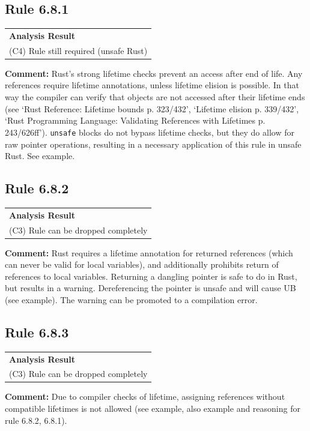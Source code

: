 \subsection*{Rule 6.8.1}
\begin{longtable}{p{13cm}}
\textbf{Analysis Result} \\
(C4) Rule still required (unsafe Rust) \\
\end{longtable}
\textbf{Comment:} Rust's strong lifetime checks prevent an access after end of life. Any references require lifetime annotations, unless lifetime elision is possible. In that way the compiler can verify that objects are not accessed after their lifetime ends (see `Rust Reference: Lifetime bounds p. 323/432', `Lifetime elision p. 339/432', `Rust Programming Language: Validating References with Lifetimes p. 243/626ff'). \texttt{unsafe} blocks do not bypass lifetime checks, but they do allow for raw pointer operations, resulting in a necessary application of this rule in unsafe Rust. See example. \\


\subsection*{Rule 6.8.2}
\begin{longtable}{p{13cm}}
\textbf{Analysis Result} \\
(C3) Rule can be dropped completely \\
\end{longtable}
\textbf{Comment:} Rust requires a lifetime annotation for returned references (which can never be valid for local variables), and additionally prohibits return of references to local variables. Returning a dangling pointer is safe to do in Rust, but results in a warning. Dereferencing the pointer is unsafe and will cause UB (see example). The warning can be promoted to a compilation error. \\


\subsection*{Rule 6.8.3}
\begin{longtable}{p{13cm}}
\textbf{Analysis Result} \\
(C3) Rule can be dropped completely \\
\end{longtable}
\textbf{Comment:} Due to compiler checks of lifetime, assigning references without compatible lifetimes is not allowed (see example, also example and reasoning for rule 6.8.2, 6.8.1). \\


